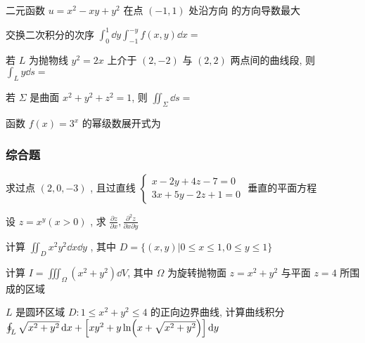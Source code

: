 \begin{ti}
	二元函数 $u=x^{2}-x y+y^{2}$ 在点 $(-1,1)$ 处沿方向 \hua{}的方向导数最大
\end{ti}

\begin{ti}
	交换二次积分的次序 $\int_0^1 \dd{y}\int_{-1}^{-y} f(x,y)\dd{x}=$ \hua{}
\end{ti}

\begin{ti}
	若 $L$ 为抛物线 $y^2=2x$ 上介于 $(2,-2)$ 与 $(2,2)$ 两点间的曲线段, 则 $\int_{L} y\dd{s}=$ \hua{}
\end{ti}

\begin{ti}
	若 $\Sigma$ 是曲面 $x^2+y^2+z^2=1$, 则 $\iint_{\Sigma} \dd{s}=$ \hua{}
\end{ti}

\begin{ti}
	函数 $f(x)=3^x$ 的幂级数展开式为 \hua{}
\end{ti}

\subsubsection{综合题}
\begin{ti}[$6$ 分]
	求过点 $(2,0,-3)$ , 且过直线 $\begin{cases}
		x-2 y+4 z-7=0\\
		3 x+5 y-2 z+1=0
		\end{cases}$ 垂直的平面方程
\end{ti}

\begin{ti}[$6$ 分]
	设 $z=x^{y}(x>0)$ , 求 $\frac{\partial z}{\partial x}, \frac{\partial^{2} z}{\partial x \partial y}$
\end{ti}

\begin{ti}[$6$ 分]
	计算 $\iint_{D} x^{2} y^{2} \dd{x} \dd{y}$ , 其中 $D=\{(x, y) | 0 \leqslant x \leqslant 1,0 \leqslant y \leqslant 1\}$
\end{ti}

\begin{ti}[$6$ 分]
	计算 $I=\iiint_{\Omega}\left(x^{2}+y^{2}\right) \dd{V}$, 其中 $\Omega$ 为旋转抛物面 $z=x^{2}+y^{2}$ 与平面 $z=4$ 所围成的区域
\end{ti}

\begin{ti}[$8$ 分]
	$L$ 是圆环区域 $D : 1 \leqslant x^{2}+y^{2} \leqslant 4$ 的正向边界曲线, 计算曲线积分 $\oint_{L} \sqrt{x^{2}+y^{2}} \dd{x}+\Bigl[x y^{2}+y \ln \Bigl(x+\sqrt{x^{2}+y^{2}}\Bigr)\Bigr] \dd{y}$
\end{ti}

